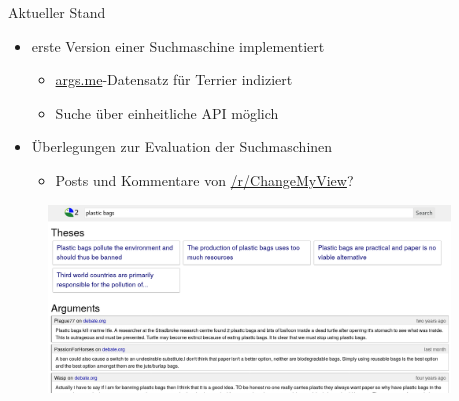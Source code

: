 \documentclass{beamer}
\begin{document}
	\begin{frame}{Aktueller Stand}
		\begin{itemize}
			\item erste Version einer Suchmaschine implementiert
			\begin{itemize}
				\item \url{args.me}-Datensatz für Terrier indiziert
				\item Suche über einheitliche API möglich
			\end{itemize}
			\item Überlegungen zur Evaluation der Suchmaschinen
			\begin{itemize}
				\item Posts und Kommentare von \url{/r/ChangeMyView}?
			\end{itemize}
		\end{itemize}
		\begin{figure}
			\includegraphics[width=0.95\textwidth]{img/searchui-prototype}
		\end{figure}
	\end{frame}
\end{document}
